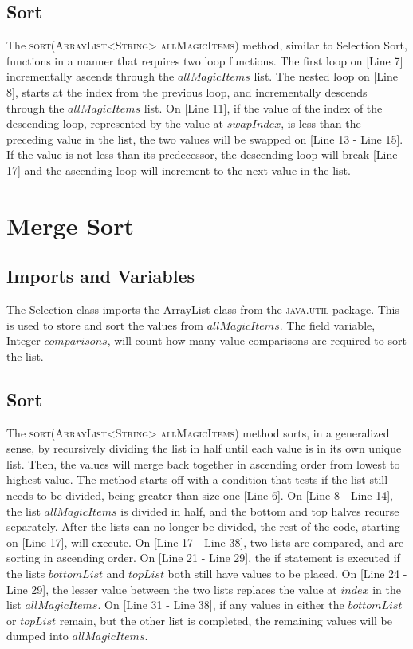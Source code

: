 \documentclass[letterpaper, 10pt,DIV=13]{scrartcl}
\begin{document}
\subsection{Sort}
The \textsc{sort(ArrayList<String> allMagicItems)} method, similar to Selection Sort, functions in a manner that requires two loop functions. The first loop on [Line 7] incrementally ascends through the $allMagicItems$ list. The nested loop on [Line 8], starts at the index from the previous loop, and incrementally descends through the $allMagicItems$ list. On [Line 11], if the value of the index of the descending loop, represented by the value at $swapIndex$, is less than the preceding value in the list, the two values will be swapped on [Line 13 - Line 15]. If the value is not less than its predecessor, the descending loop will break [Line 17] and the ascending loop will increment to the next value in the list. 



\section{Merge Sort}

\subsection{Imports and Variables}
The Selection class imports the ArrayList class from the \textsc{java.util} package. This is used to store and sort the values from $allMagicItems$. The field variable, Integer $comparisons$, will count how many value comparisons are required to sort the list.

\subsection{Sort}
The \textsc{sort(ArrayList<String> allMagicItems)} method sorts, in a generalized sense, by recursively dividing the list in half until each value is in its own unique list. Then, the values will merge back together in ascending order from lowest to highest value. The method starts off with a condition that tests if the list still needs to be divided, being greater than size one [Line 6]. On [Line 8 - Line 14], the list $allMagicItems$ is divided in half, and the bottom and top halves recurse separately. After the lists can no longer be divided, the rest of the code, starting on [Line 17], will execute. On [Line 17 - Line 38], two lists are compared, and are sorting in ascending order. On [Line 21 - Line 29], the if statement is executed if the lists $bottomList$ and $topList$ both still have values to be placed. On [Line 24 - Line 29], the lesser value between the two lists replaces the value  at $index$ in the list $allMagicItems$. On [Line 31 - Line 38], if any values in either the $bottomList$ or $topList$ remain, but the other list is completed, the remaining values will be dumped into $allMagicItems$.
\end{document}

